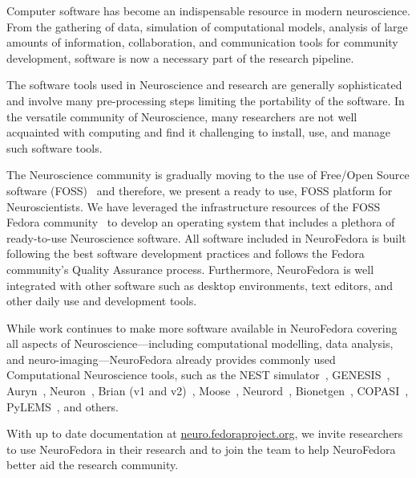 
Computer software has become an indispensable resource in modern neuroscience. From the gathering of data, simulation of computational models, analysis of large amounts of information, collaboration, and communication tools for community development, software is now a necessary part of the research pipeline.

The software tools used in Neuroscience and research are generally sophisticated and involve many pre-processing steps limiting the portability of the software. In the versatile community of Neuroscience, many researchers are not well acquainted with computing and find it challenging to install, use, and manage such software tools.

The Neuroscience community is gradually moving to the use of Free/Open Source software (FOSS)~\cite{Gleeson2017} and therefore, we present a ready to use, FOSS platform for Neuroscientists.
We have leveraged the infrastructure resources of the FOSS Fedora community~\cite{RedHat2008} to develop an operating system that includes a plethora of ready-to-use Neuroscience software.
All software included in NeuroFedora is built following the best software development practices and follows the Fedora community's Quality Assurance process. Furthermore, NeuroFedora is well integrated with other software such as desktop environments, text editors, and other daily use and development tools.

While work continues to make more software available in NeuroFedora covering all aspects of Neuroscience---including computational modelling, data analysis, and neuro-imaging---NeuroFedora already provides commonly used Computational Neuroscience tools, such as the NEST simulator~\cite{Linssen2018}, GENESIS~\cite{Bower2003}, Auryn~\cite{Zenke2014}, Neuron~\cite{Hines1997}, Brian (v1 and v2)~\cite{Goodman2009}, Moose~\cite{Dudani2009}, Neurord~\cite{Jedrzejewski2016}, Bionetgen~\cite{Harris2016}, COPASI~\cite{Mendes2009}, PyLEMS~\cite{Vella2014}, and others.

With up to date documentation at \url{neuro.fedoraproject.org}, we invite researchers to use NeuroFedora in their research and to join the team to help NeuroFedora better aid the research community.